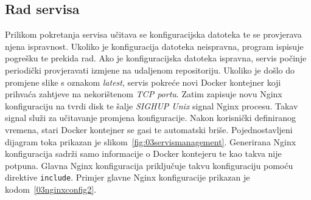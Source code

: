 \subsection{Rad servisa}
Prilikom pokretanja servisa učitava se konfiguracijska datoteka te se provjerava njena ispravnost.
Ukoliko je konfiguracija datoteka neispravna, program ispisuje pogrešku te prekida rad. Ako je
konfiguracijska datoteka ispravna, servis počinje periodički provjeravati izmjene na udaljenom
repositoriju. Ukoliko je došlo do promjene slike s oznakom \textit{latest}, servis pokreće novi
Docker kontejner koji prihvaća zahtjeve na nekorištenom \textit{TCP portu}. Zatim zapisuje novu
Nginx konfiguraciju na tvrdi disk te šalje \textit{SIGHUP Unix} signal Nginx procesu. Takav signal
služi za učitavanje promjena konfiguracije. Nakon korisnički definiranog vremena, stari Docker
kontejner se gasi te automatski briše. Pojednostavljeni dijagram toka prikazan je
slikom~\ref{fig:03servismanagement}. Generirana Nginx konfiguracija sadrži samo informacije o
Docker kontejeru te kao takva nije potpuna.  Glavna Nginx konfiguracija priključuje takvu
konfiguraciju pomoću direktive \texttt{include}.  Primjer glavne Nginx konfiguracije prikazan je
kodom~\ref{03nginxconfig2}.

